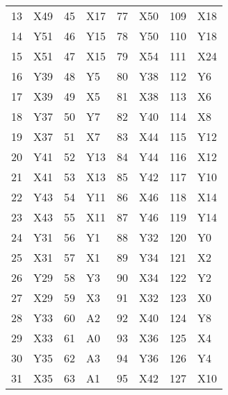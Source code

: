\begin{table}[!htbp]
\begin{tabular}{p{}p{}p{}p{}p{}p{}p{}p{}}
  13  & X49 & 45  & X17 & 77  & X50 & 109 & X18 \\
  \cellcolor[HTML]{AA0044}14  & Y51 & \cellcolor[HTML]{AA0044}46  & Y15 & \cellcolor[HTML]{AA0044}78  & Y50 & \cellcolor[HTML]{AA0044}110 & Y18 \\
  15  & X51 & 47  & X15 & 79  & X54 & 111 & X24 \\
  \cellcolor[HTML]{AA0044}16  & Y39 & \cellcolor[HTML]{AA0044}48  & Y5  & \cellcolor[HTML]{AA0044}80  & Y38 & \cellcolor[HTML]{AA0044}112 & Y6  \\
  17  & X39 & 49  & X5  & 81  & X38 & 113 & X6  \\
  \cellcolor[HTML]{AA0044}18  & Y37 & \cellcolor[HTML]{AA0044}50  & Y7  & \cellcolor[HTML]{AA0044}82  & Y40 & 114 & X8  \\
  19  & X37 & 51  & X7  & 83  & X44 & \cellcolor[HTML]{AA0044}115 & Y12 \\
  \cellcolor[HTML]{AA0044}20  & Y41 & \cellcolor[HTML]{AA0044}52  & Y13 & \cellcolor[HTML]{AA0044}84  & Y44 & 116 & X12 \\
  21  & X41 & 53  & X13 & \cellcolor[HTML]{AA0044}85  & Y42 & \cellcolor[HTML]{AA0044}117 & Y10 \\
  \cellcolor[HTML]{AA0044}22  & Y43 & \cellcolor[HTML]{AA0044}54  & Y11 & 86  & X46 & 118 & X14 \\
  23  & X43 & 55  & X11 & \cellcolor[HTML]{AA0044}87  & Y46 & \cellcolor[HTML]{AA0044}119 & Y14 \\
  \cellcolor[HTML]{AA0044}24  & Y31 & \cellcolor[HTML]{AA0044}56  & Y1  & \cellcolor[HTML]{AA0044}88  & Y32 & \cellcolor[HTML]{AA0044}120 & Y0  \\
  25  & X31 & 57  & X1  & \cellcolor[HTML]{AA0044}89  & Y34 & 121 & X2  \\
  \cellcolor[HTML]{AA0044}26  & Y29 & \cellcolor[HTML]{AA0044}58  & Y3  & 90  & X34 & \cellcolor[HTML]{AA0044}122 & Y2  \\
  27  & X29 & 59  & X3  & 91  & X32 & 123 & X0  \\
  \cellcolor[HTML]{AA0044}28  & Y33 & \cellcolor[HTML]{AA0044}60  & A2  & 92  & X40 & \cellcolor[HTML]{AA0044}124 & Y8  \\
  29  & X33 & 61  & A0  & 93  & X36 & 125 & X4  \\
  \cellcolor[HTML]{AA0044}30  & Y35 & \cellcolor[HTML]{AA0044}62  & A3  & \cellcolor[HTML]{AA0044}94  & Y36 & \cellcolor[HTML]{AA0044}126 & Y4  \\
  31  & X35 & 63  & A1  & 95  & X42 & 127 & X10 \\
  \bottomrule
  \end{tabular}
\end{table}
